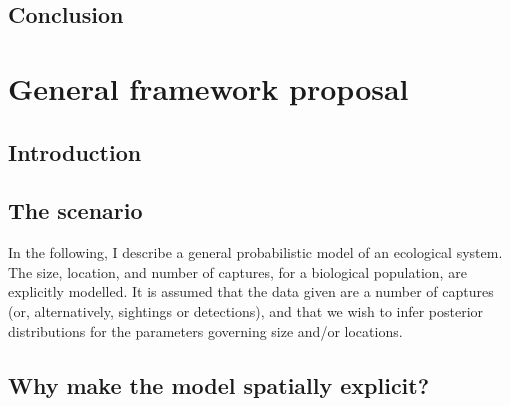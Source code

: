 \documentclass[
  oneside]{book}
\begin{document}
\hypertarget{conclusion}{%
\section{Conclusion}\label{conclusion}}

\hypertarget{general-framework-proposal}{%
\chapter{General framework proposal}\label{general-framework-proposal}}

\hypertarget{introduction-2}{%
\section{Introduction}\label{introduction-2}}

\hypertarget{the-scenario}{%
\section{The scenario}\label{the-scenario}}

In the following, I describe a general probabilistic model of an ecological system. The size, location, and number of captures, for a biological population, are explicitly modelled. It is assumed that the data given are a number of captures (or, alternatively, sightings or detections), and that we wish to infer posterior distributions for the parameters governing size and/or locations.

\hypertarget{why-make-the-model-spatially-explicit}{%
\section{Why make the model spatially explicit?}\label{why-make-the-model-spatially-explicit}}
\end{document}
